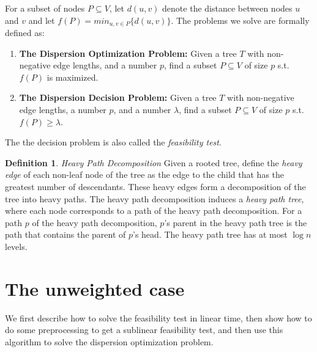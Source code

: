 \documentclass[11pt,a4paper]{article}
\theoremstyle{definition}
\newtheorem{definition}{Definition}
\theoremstyle{remark}
\begin{document}
For a subset of nodes $P\subseteq V$, let $d(u,v)$ denote the distance between nodes $u$ and $v$ and let $f(P)=min_{u,v\in P} \{d(u,v)\}$. The problems we solve are formally defined as: 

\begin{enumerate}
\item {\bf The Dispersion Optimization Problem:} Given a tree $T$ with non-negative edge lengths, and a  number $p$, find a subset $P\subseteq V$ of size $p$ s.t.  $f(P)$ is maximized. 

\item {\bf The Dispersion Decision Problem:}  Given a tree $T$ with non-negative edge lengths, a number $p$, and a number $\lambda$, find a subset $P\subseteq V$ of size $p$ s.t. $f(P)\geq\lambda$.
\end{enumerate}

\noindent The the decision problem is also called the {\em feasibility test}.

\begin{definition}
\emph{Heavy Path Decomposition} \cite{Sleator1983} Given a rooted tree, define the \emph{heavy edge} of each non-leaf node of the tree as the edge to the child that has the greatest number of descendants. These heavy edges form a decomposition of the tree into heavy paths. The heavy path decomposition induces a \emph{heavy path tree}, where each node corresponds to a path of the heavy path decomposition. For a path $p$ of the heavy path decomposition, $p$'s parent in the heavy path tree is the path that contains the parent of $p$'s head. The heavy path tree has at most $\log n$ levels.
\end{definition}
%
%
\section{The unweighted case}
We first describe how to solve the feasibility test in linear time, then show how to do some preprocessing to get a sublinear feasibility test, and then use this algorithm to solve the dispersion optimization problem.
\end{document}
